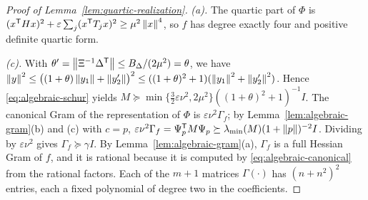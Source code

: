 \begin{proof}[Proof of Lemma~\ref{lem:quartic-realization}]
\emph{(a).} The quartic part of $\Phi$ is
$(x^{\mathsf T}Hx)^2+\varepsilon\sum_j(x^{\mathsf T}T_jx)^2\ge\mu^2\left\lVert x\right\rVert^4$,
so $f$ has degree exactly four and positive definite quartic form.

\emph{(c).} With $\theta'=\left\lVert\Xi^{-1}\Delta^{\mathsf T}\right\rVert\le
B_\Delta/(2\mu^2)=\theta$, we have
$\left\lVert y\right\rVert^2\le\bigl((1+\theta)\left\lVert y_1\right\rVert+\left\lVert y_2'\right\rVert\bigr)^2
\le((1+\theta)^2+1)(\left\lVert y_1\right\rVert^2+\left\lVert y_2'\right\rVert^2)$. Hence
\eqref{eq:algebraic-schur} yields
$M\succeq\min\{\tfrac32\varepsilon\nu^2,2\mu^2\}((1+\theta)^2+1)^{-1}I$. The
canonical Gram of the representation of $\Phi$ is $\varepsilon\nu^2\Gamma_f$;
by Lemma~\ref{lem:algebraic-gram}(b) and (c) with $c=p$,
$\varepsilon\nu^2\Gamma_f=\Psi_p^{\mathsf T}M\Psi_p\succeq
\lambda_{\min}(M)(1+\left\lVert p\right\rVert)^{-2}I$. Dividing by $\varepsilon\nu^2$ gives
$\Gamma_f\succeq\gamma I$. By Lemma~\ref{lem:algebraic-gram}(a), $\Gamma_f$
is a full Hessian Gram of $f$, and it is rational because it is computed by
\eqref{eq:algebraic-canonical} from the rational factors. Each of the $m+1$
matrices $\Gamma(\cdot)$ has $(n+n^2)^2$ entries, each a fixed polynomial of
degree two in the coefficients.
\end{proof}

